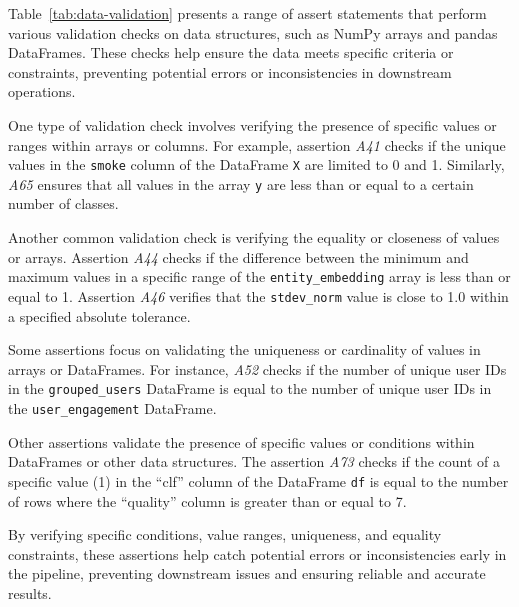 Table~\ref{tab:data-validation} presents a range of assert statements that perform various validation checks on data structures, such as NumPy arrays and pandas DataFrames. These checks help ensure the data meets specific criteria or constraints, preventing potential errors or inconsistencies in downstream operations.

One type of validation check involves verifying the presence of specific values or ranges within arrays or columns. For example, assertion \emph{A41} checks if the unique values in the \lstinline{smoke} column of the DataFrame \lstinline{X} are limited to 0 and 1. Similarly, \emph{A65} ensures that all values in the array \lstinline{y} are less than or equal to a certain number of classes.

Another common validation check is verifying the equality or closeness of values or arrays. Assertion \emph{A44} checks if the difference between the minimum and maximum values in a specific range of the \lstinline{entity_embedding} array is less than or equal to 1. Assertion \emph{A46} verifies that the \lstinline{stdev_norm} value is close to 1.0 within a specified absolute tolerance.

Some assertions focus on validating the uniqueness or cardinality of values in arrays or DataFrames. For instance, \emph{A52} checks if the number of unique user IDs in the \lstinline{grouped_users} DataFrame is equal to the number of unique user IDs in the \lstinline{user_engagement} DataFrame.

Other assertions validate the presence of specific values or conditions within DataFrames or other data structures. The assertion \emph{A73} checks if the count of a specific value (1) in the ``clf'' column of the DataFrame \lstinline{df} is equal to the number of rows where the ``quality'' column is greater than or equal to 7.

By verifying specific conditions, value ranges, uniqueness, and equality constraints, these assertions help catch potential errors or inconsistencies early in the pipeline, preventing downstream issues and ensuring reliable and accurate results.


